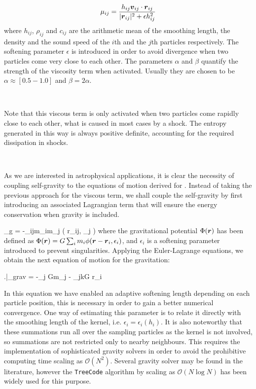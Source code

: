 \documentclass[a4,useAMS,usenatbib,usegraphicx,12pt]{article}
\begin{document}
\[ \mu_{ij} = \frac{h_{ij}\boldsymbol{ v }_{ij}\cdot \boldsymbol{ r }_{ij}}{|\boldsymbol{ r }_{ij}|^2 + 
\epsilon h_{ij}^2} \]
where $h_{ij}$, $\rho_{ij}$ and $c_{ij}$ are the arithmetic mean of the smoothing
length, the density and the sound speed of the $i$th and the $j$th particles 
respectively. The softening parameter $\epsilon$ is introduced in order to avoid
divergence when two particles come very close to each other. The parameters 
$\alpha$ and $\beta$ quantify the strength of the viscosity term when activated.
Usually they are chosen to be $\alpha \approx [0.5-1.0] $ and $\beta=2\alpha$.

\

Note that this viscous term is only activated when two particles come rapidly 
close to each other, what is caused in most cases by a shock. The entropy 
generated in this way is always positive definite, accounting for the required
dissipation in shocks.

\

As we are interested in astrophysical applications, it is clear the necessity 
of coupling self-gravity to the equations of motion derived for \SPH. Instead 
of taking the previous approach for the viscous term, we shall couple the
self-gravity by first introducing an associated Lagrangian term that will
ensure the energy conservation when gravity is included.

{ _g = -\sum_{i\neq j}m_im_j \phi( r_{ij}, \epsilon_j ) }
where the gravitational potential $\Phi(\boldsymbol{ r })$ has been defined as 
$\Phi(\boldsymbol{ r }) = G \sum_i m_i \phi(\boldsymbol{ r } - \boldsymbol{ r }_i, \epsilon_i)$, and $\epsilon_i$
is a softening parameter introduced to prevent singularities. Applying the 
Euler-Lagrange equations, we obtain the next equation of motion for the 
gravitation:


{ \left.\right|_{\mbox{\footnotesize{grav}}} = 
-\sum_j Gm_j  - \sum_{j\neq k}G
{\partial \bds r_i} }


In this equation we have enabled an adaptive softening length depending on each 
particle position, this is necessary in order to gain a better numerical 
convergence. One way of estimating this parameter is to relate it directly with
the smoothing length of the kernel, i.e. $\epsilon_i = \epsilon_i(h_i)$. It is 
also noteworthy that these summations run all over the sampling particles as the 
kernel is not involved, so summations are not restricted only to nearby neighbours. 
This requires the implementation of sophisticated gravity solvers in order to 
avoid the prohibitive computing time scaling as $\mathcal{O}(N^2)$. Several 
gravity solver may be found in the literature, however the \texttt{TreeCode} 
algorithm by \citet{barnes1986} scaling as $\mathcal{O}(N\log N)$ has been widely 
used for this purpose.
\end{document}
